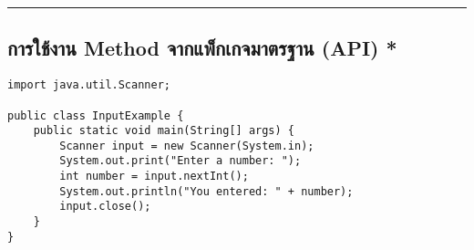 \documentclass[11pt]{article}
\begin{document}
\noindent\rule{\textwidth}{0.5pt}
\subsection{การใช้งาน Method จากแพ็กเกจมาตรฐาน (API) *}
\label{sec:org25e10c9}
\begin{verbatim}
import java.util.Scanner;

public class InputExample {
    public static void main(String[] args) {
        Scanner input = new Scanner(System.in);
        System.out.print("Enter a number: ");
        int number = input.nextInt();
        System.out.println("You entered: " + number);
        input.close();
    }
}
\end{verbatim}
\end{document}

